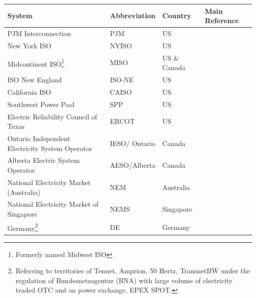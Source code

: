\begin{table}[h!]
	\small
	\centering
	\begin{tabular}{L{5cm} l l l}
		\hline
		\hline
		\textbf{System} & \textbf{Abbreviation} & \textbf{Country} & \textbf{Main Reference} \\
		\hline
		\hline
		PJM Interconnection & PJM & US & \cite{Rebours2009,Srivastava2011,Cochran2013,EllisonJ.F.TesfatsionL.S.LooseV.W.Byrne2012,Gilstrap2015,Brown2015,Borenstein2015,PJM_web,PJM2017b,PJM2017c}\\
		\hline
		New York ISO & NYISO & US & \cite{Cochran2013,EllisonJ.F.TesfatsionL.S.LooseV.W.Byrne2012,Gilstrap2015,Borenstein2015,NYISO_web}\\
		\hline
		Midcontinent ISO\footnote{Formerly named Midwest ISO}& MISO & US \& Canada& \cite{EllisonJ.F.TesfatsionL.S.LooseV.W.Byrne2012,Gilstrap2015,Borenstein2015,MISO_web}\\
		\hline
		ISO New England & ISO-NE & US & \cite{EllisonJ.F.TesfatsionL.S.LooseV.W.Byrne2012,Gilstrap2015,Borenstein2015,ISO_NE_web}\\
		\hline
		California ISO & CAISO & US& \cite{Rebours2009,EllisonJ.F.TesfatsionL.S.LooseV.W.Byrne2012,Gilstrap2015,Borenstein2015,CAISO_web}\\
		\hline
		Southwest Power Pool & SPP & US & \cite{EllisonJ.F.TesfatsionL.S.LooseV.W.Byrne2012,Gilstrap2015,Borenstein2015,SPP_web}\\
		\hline
		Electric Reliability Council of Texas & ERCOT & US & \cite{Srivastava2011,EllisonJ.F.TesfatsionL.S.LooseV.W.Byrne2012,Brown2015,Gilstrap2015,Borenstein2015,ERCOT_web}\\
		\hline
		Ontario Independent Electricity System Operator& IESO/ Ontario& Canada & \cite{Cochran2013,Brown2015,Ontario_web}\\
		\hline
		Alberta Electric System Operator & AESO/Alberta & Canada &  \cite{Brown2015,Alberta_web}\\
		\hline
		National Electricity Market (Australia) & NEM & Australia & \cite{Srivastava2011,Brown2015,AEMO2010,AEMO2015a}\\
		\hline
		National Electricity Market of Singapore & NEMS & Singapore & \cite{Brown2015} \\
		\hline
		Germany\footnote{Referring to territories of Tennet, Amprion, 50 Hertz, TransnetBW under the regulation of Bundesnetzagentur (BNA) with large volume of electricity traded OTC and on power exchange, EPEX SPOT. } & DE & Germany & \cite{FrontierEconomics2016,Wartsila2014,ConsentecGmbH2014,Deloitte2015} \\

\end{tabular}
\end{table}
